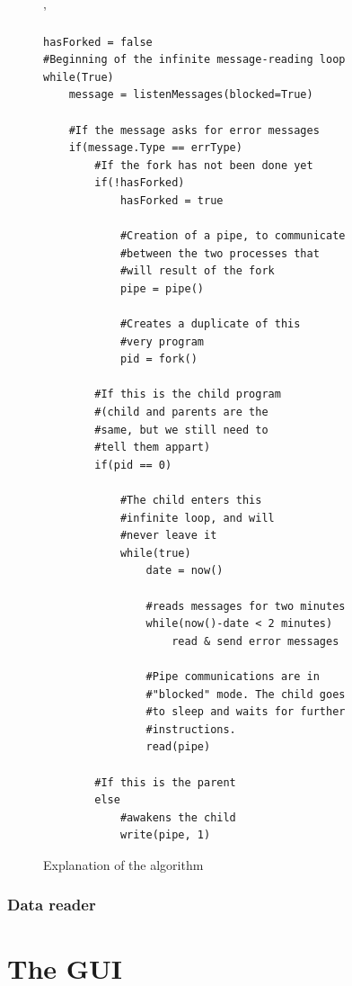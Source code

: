 \documentclass{themeensg}
\begin{document}
\begin{figure}[!ht]
	\centering
	\lstset{language=Python}'
 
	\begin{lstlisting}[frame=single]
hasForked = false
#Beginning of the infinite message-reading loop
while(True)	
	message = listenMessages(blocked=True)
	
	#If the message asks for error messages
	if(message.Type == errType)
		#If the fork has not been done yet
		if(!hasForked)	
			hasForked = true
			
			#Creation of a pipe, to communicate
			#between the two processes that
			#will result of the fork
			pipe = pipe()
			
			#Creates a duplicate of this
			#very program
			pid = fork()
			
		#If this is the child program
		#(child and parents are the 
		#same, but we still need to
		#tell them appart)
		if(pid == 0)
		
			#The child enters this
			#infinite loop, and will
			#never leave it
			while(true)
				date = now()
				
				#reads messages for two minutes
				while(now()-date < 2 minutes)
					read & send error messages
					
				#Pipe communications are in 
				#"blocked" mode. The child goes
				#to sleep and waits for further
				#instructions.
				read(pipe)
				
		#If this is the parent
		else
			#awakens the child
			write(pipe, 1)				
	\end{lstlisting}
	\caption{Explanation of the algorithm}
\end{figure}


\subsubsection{Data reader}

\clearpage
\section{The GUI}
\end{document}
